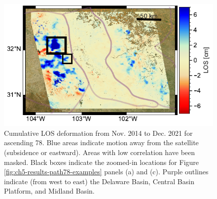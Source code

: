 \begin{figure}
	\centering
	\includegraphics[width=.99\textwidth]{figures/chapter5-lowess/figure-results-los-path78.pdf}
	\caption[Cumulative 7-year LOS deformation for three Sentinel-1 paths]{
		Cumulative LOS deformation from Nov. 2014 to Dec. 2021 for ascending 78. Blue areas indicate motion away from the satellite (subsidence or eastward). Areas with low correlation have been masked.
		Black boxes indicate the zoomed-in locations for Figure \ref{fig:ch5-results-path78-examples} panels (a) and (c).
		Purple outlines indicate (from west to east) the Delaware Basin, Central Basin Platform, and Midland Basin.
	}
	\label{fig:ch5-results-path78}
\end{figure}

